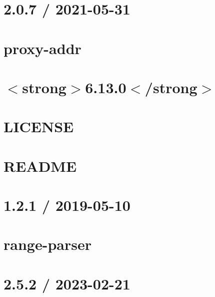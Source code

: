 \documentclass[twoside]{book}
\newcommand{\+}{\discretionary{\mbox{\scriptsize$\hookleftarrow$}}{}{}}
\begin{document}
\chapter{2.0.7 / 2021-\/05-\/31}
\label{md_src_nodejs_node_modules_proxy_addr_HISTORY}

\chapter{proxy-\/addr}
\label{md_src_nodejs_node_modules_proxy_addr_README}

\chapter{\texorpdfstring{$<$}{<}strong\texorpdfstring{$>$}{>}6.13.0\texorpdfstring{$<$}{<}/strong\texorpdfstring{$>$}{>}}
\label{md_src_nodejs_node_modules_qs_CHANGELOG}

\chapter{LICENSE}
\label{md_src_nodejs_node_modules_qs_LICENSE}

\chapter{README}
\label{md_src_nodejs_node_modules_qs_README}

\chapter{1.2.1 / 2019-\/05-\/10}
\label{md_src_nodejs_node_modules_range_parser_HISTORY}

\chapter{range-\/parser}
\label{md_src_nodejs_node_modules_range_parser_README}

\chapter{2.5.2 / 2023-\/02-\/21}
\label{md_src_nodejs_node_modules_raw_body_HISTORY}

\end{document}
